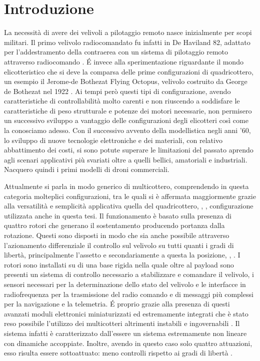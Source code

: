 \chapter{Introduzione}
La necessità di avere dei velivoli a pilotaggio remoto nasce inizialmente per scopi militari. Il primo velivolo radiocomandato fu infatti in De Haviland 82, adattato per l'addestramento della contraerea con un sistema di pilotaggio remoto attraverso radiocomando \cite{histoDrone}. \'E invece alla sperimentazione riguardante il mondo elicotteristico che si deve la comparsa delle prime configurazioni di quadricottero, un esempio il Jerome-de Bothezat Flying Octopus, velivolo costruito da George de Bothezat nel 1922 \cite{Young}. Ai tempi però questi tipi di configurazione, avendo caratteristiche di controllabilità molto carenti e non riuscendo a soddisfare le caratteristiche di peso strutturale e potenze dei motori necessarie, non permisero un successivo sviluppo a vantaggio delle configurazioni degli elicotteri così come la conosciamo adesso. Con il successivo avvento della modellistica negli anni '60, lo sviluppo di nuove tecnologie elettroniche e dei materiali, con relativo abbattimento dei costi, si sono potute superare le limitazioni del passato aprendo agli scenari applicativi più svariati oltre a quelli bellici, amatoriali e industriali. Nacquero quindi i primi modelli di droni commerciali.

Attualmente si parla in modo generico di multicottero, comprendendo in questa categoria molteplici configurazioni, tra le quali si è affermata maggiormente grazie alla versatilità e semplicità applicativa quella del quadricottero, \cite{multi2015}, \cite{modelquad}, configurazione utilizzata anche in questa tesi. Il funzionamento è basato sulla presenza di quattro rotori che generano il sostentamento producendo portanza dalla rotazione. Questi sono disposti in modo che sia anche possibile attraverso l'azionamento differenziale il controllo sul velivolo su tutti quanti i gradi di libertà, principalmente l'assetto e secondariamente a questa la posizione, \cite{multi2015}, \cite{modelquad}. I rotori sono installati su di una base rigida nella quale oltre al payload sono presenti un sistema di controllo necessario a stabilizzare e comandare il velivolo, i sensori necessari per la determinazione dello stato del velivolo e le interfacce in radiofrequenza per la trasmissione del radio comando e di messaggi più complessi per la navigazione e la telemetria. \'E proprio grazie alla presenza di questi avanzati moduli elettronici miniaturizzati ed estremamente integrati che è stato reso possibile l'utilizzo dei multicotteri altrimenti instabili e ingovernabili \cite{multi2015}. Il sistema infatti è caratterizzato dall'essere un sistema estremamente non lineare con dinamiche accoppiate. Inoltre, avendo in questo caso solo quattro attuazioni, esso risulta essere sottoattuato: meno controlli rispetto ai gradi di libertà \cite{nonlinear2008}.

